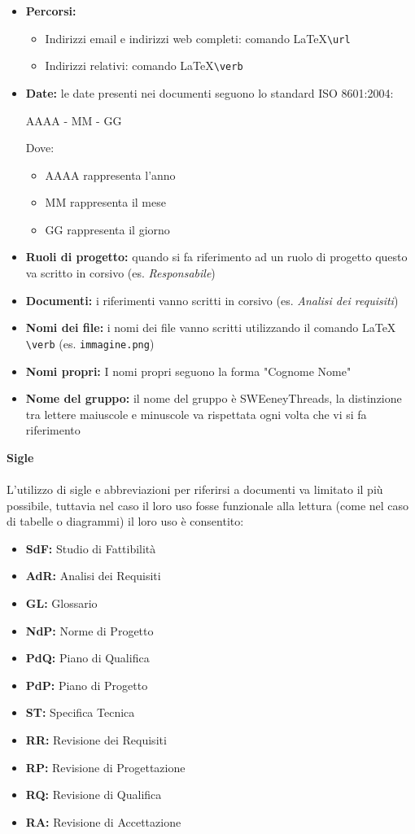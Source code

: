 \documentclass[a4paper]{report}
\begin{document}
	\begin{itemize}
		\item \textbf{Percorsi:} 
		\begin{itemize}
			\item Indirizzi email e indirizzi web completi: comando \LaTeX \space \verb|\url|
			\item Indirizzi relativi: comando \LaTeX  \space \verb|\verb|
		\end{itemize}
		\item \textbf{Date:} le date presenti nei documenti seguono lo standard ISO 8601:2004:
		\begin{center}
			AAAA - MM - GG
		\end{center}
		Dove:
		\begin{itemize}
			\item AAAA rappresenta l'anno 
			\item MM rappresenta il mese
			\item GG rappresenta il giorno
		\end{itemize}
		\item \textbf{Ruoli di progetto:} quando si fa riferimento ad un ruolo di progetto questo va scritto in corsivo
		(es. \textit{Responsabile})
		\item \textbf{Documenti:} i riferimenti vanno scritti in corsivo (es. \textit{Analisi dei requisiti})
		\item \textbf{Nomi dei file:} i nomi dei file vanno scritti utilizzando il comando \LaTeX \space 
		\verb|\verb| (es. \verb|immagine.png|)
		\item \textbf{Nomi propri:} I nomi propri seguono la forma "Cognome Nome"
		\item \textbf{Nome del gruppo:} il nome del gruppo è SWEeneyThreads, la distinzione tra lettere maiuscole e
		minuscole va rispettata ogni volta che vi si fa riferimento
	\end{itemize}
	\textbf{Sigle} \\ \\
	L'utilizzo di sigle e abbreviazioni per riferirsi a documenti va limitato il più possibile, tuttavia nel caso il loro uso
	fosse funzionale alla lettura (come nel caso di tabelle o diagrammi) il loro uso è consentito:
	\begin{itemize}
		\item \textbf{SdF:} Studio di Fattibilità
		\item \textbf{AdR:} Analisi dei Requisiti
		\item \textbf{GL:} Glossario
		\item \textbf{NdP:} Norme di Progetto
		\item \textbf{PdQ:} Piano di Qualifica
		\item \textbf{PdP:} Piano di Progetto
		\item \textbf{ST:} Specifica Tecnica
		\item \textbf{RR:} Revisione dei Requisiti
		\item \textbf{RP:} Revisione di Progettazione
		\item \textbf{RQ:} Revisione di Qualifica
		\item \textbf{RA:} Revisione di Accettazione
	\end{itemize}
\end{document}
